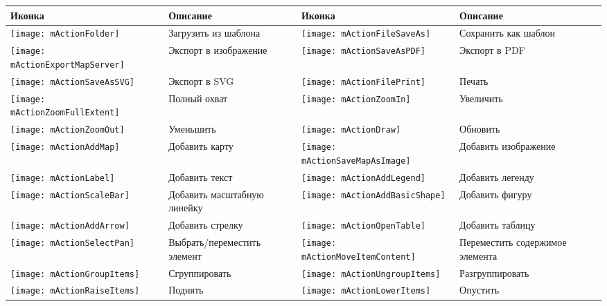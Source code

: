 \begin{table}[h]
\centering\small
\renewcommand{\arraystretch}{2}
 \begin{tabular}{|m{1cm}|m{5.4cm}|m{1cm}|m{5.4cm}|}
 \hline \textbf{Иконка} & \textbf{Описание} & \textbf{Иконка} &
 \textbf{Описание} \\
 \hline \texttt{[image: mActionFolder]}
 & Загрузить из шаблона &
 \texttt{[image: mActionFileSaveAs]} & Сохранить как шаблон \\
 \hline \texttt{[image: mActionExportMapServer]}
 & Экспорт в изображение &
 \texttt{[image: mActionSaveAsPDF]} & Экспорт в PDF \\
 \hline \texttt{[image: mActionSaveAsSVG]} & Экспорт в SVG
 & \texttt{[image: mActionFilePrint]}
 & Печать \\
 \hline \texttt{[image: mActionZoomFullExtent]} & Полный
 охват & \texttt{[image: mActionZoomIn]} & Увеличить \\
 \hline \texttt{[image: mActionZoomOut]} & Уменьшить&
 \texttt{[image: mActionDraw]} & Обновить \\
 \hline \texttt{[image: mActionAddMap]} & Добавить
 карту & \texttt{[image: mActionSaveMapAsImage]}
 & Добавить изображение \\
 \hline \texttt{[image: mActionLabel]} & Добавить текст
 & \texttt{[image: mActionAddLegend]} & Добавить
 легенду \\
 \hline \texttt{[image: mActionScaleBar]} & Добавить
 масштабную линейку & \texttt{[image: mActionAddBasicShape]}
 & Добавить фигуру \\
 \hline \texttt{[image: mActionAddArrow]} & Добавить
 стрелку & \texttt{[image: mActionOpenTable]} & Добавить
 таблицу \\
 \hline \texttt{[image: mActionSelectPan]} & Выбрать/переместить
 элемент &
 \texttt{[image: mActionMoveItemContent]} & Переместить
 содержимое элемента \\
 \hline \texttt{[image: mActionGroupItems]} & Сгруппировать &
 \texttt{[image: mActionUngroupItems]} & Разгруппировать \\
 \hline \texttt{[image: mActionRaiseItems]} & Поднять &
 \texttt{[image: mActionLowerItems]} & Опустить \\

\end{tabular}
\end{table}

